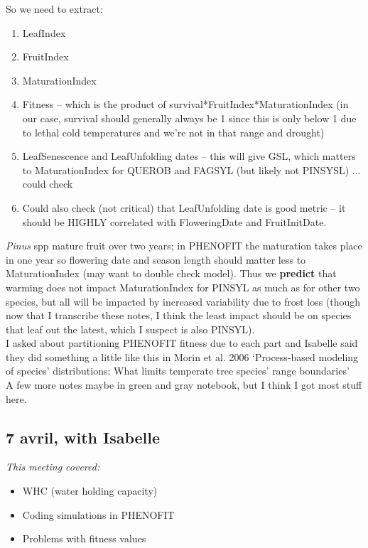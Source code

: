 \documentclass[11pt,letter]{article}
\begin{document}
So we need to extract: 

\begin{enumerate}
\item LeafIndex
\item FruitIndex 
\item MaturationIndex
\item Fitness -- which is the product of survival*FruitIndex*MaturationIndex (in our case, survival should generally always be 1 since this is only below 1 due to lethal cold temperatures and we're not in that range and drought)
\item LeafSenescence and LeafUnfolding dates -- this will give GSL, which matters to MaturationIndex for QUEROB and FAGSYL (but likely not PINSYSL) ... could check
\item Could also check (not critical) that LeafUnfolding date is good metric -- it should be HIGHLY correlated with FloweringDate and FruitInitDate. 
\end{enumerate}

\emph{Pinus} spp mature fruit over two years; in PHENOFIT the maturation takes place in one year so flowering date and season length should matter less to MaturationIndex (may want to double check model). Thus we {\bf predict} that warming does not impact MaturationIndex for PINSYL as much as for other two species, but all will be impacted by increased variability due to frost loss (though now that I transcribe these notes, I think the least impact should be on species that leaf out the latest, which I suspect is also PINSYL).  \\

I asked about partitioning PHENOFIT fitness due to each part and Isabelle said they did something a little like this in Morin et al. 2006 `Process-based modeling of species’ distributions: What limits temperate tree species’ range boundaries' \\%

A few more notes maybe in green and gray notebook, but I think I got most stuff here. 

\subsection{7 avril, with Isabelle}

\emph{This meeting covered:}
\begin{itemize}
\item WHC (water holding capacity)
\item Coding simulations in PHENOFIT
\item Problems with fitness values
\end{itemize}
\end{document}
